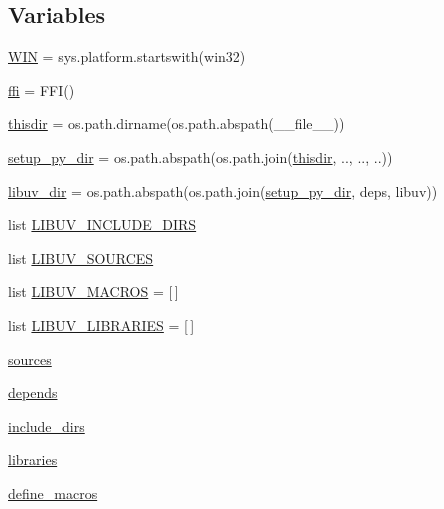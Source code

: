 \subsection*{Variables}
\begin{DoxyCompactItemize}
\item 
\hyperlink{namespacegevent_1_1libuv_1_1__corecffi__build_a2ec910473aa5ebc6912ef9ab9a5e9d19}{W\+IN} = sys.\+platform.\+startswith(\textquotesingle{}win32\textquotesingle{})
\item 
\hyperlink{namespacegevent_1_1libuv_1_1__corecffi__build_a4bb1b8330f479edbb77d00f554cabae4}{ffi} = F\+FI()
\item 
\hyperlink{namespacegevent_1_1libuv_1_1__corecffi__build_ac98ff08f1ed6cc8b007ec1911960c90f}{thisdir} = os.\+path.\+dirname(os.\+path.\+abspath(\+\_\+\+\_\+file\+\_\+\+\_\+))
\item 
\hyperlink{namespacegevent_1_1libuv_1_1__corecffi__build_a89415d476f2dadbcfd1af5bf86001bef}{setup\+\_\+py\+\_\+dir} = os.\+path.\+abspath(os.\+path.\+join(\hyperlink{namespacegevent_1_1libuv_1_1__corecffi__build_ac98ff08f1ed6cc8b007ec1911960c90f}{thisdir}, \textquotesingle{}..\textquotesingle{}, \textquotesingle{}..\textquotesingle{}, \textquotesingle{}..\textquotesingle{}))
\item 
\hyperlink{namespacegevent_1_1libuv_1_1__corecffi__build_a8a8816442c32f7739091f9d27a742707}{libuv\+\_\+dir} = os.\+path.\+abspath(os.\+path.\+join(\hyperlink{namespacegevent_1_1libuv_1_1__corecffi__build_a89415d476f2dadbcfd1af5bf86001bef}{setup\+\_\+py\+\_\+dir}, \textquotesingle{}deps\textquotesingle{}, \textquotesingle{}libuv\textquotesingle{}))
\item 
list \hyperlink{namespacegevent_1_1libuv_1_1__corecffi__build_a365fd82718cbe869e92a3b470777e428}{L\+I\+B\+U\+V\+\_\+\+I\+N\+C\+L\+U\+D\+E\+\_\+\+D\+I\+RS}
\item 
list \hyperlink{namespacegevent_1_1libuv_1_1__corecffi__build_a0419d4ae6f61877c656f35a2537109ce}{L\+I\+B\+U\+V\+\_\+\+S\+O\+U\+R\+C\+ES}
\item 
list \hyperlink{namespacegevent_1_1libuv_1_1__corecffi__build_a65dab17a04f92f77fe5dab25b7fc0a4b}{L\+I\+B\+U\+V\+\_\+\+M\+A\+C\+R\+OS} = \mbox{[}$\,$\mbox{]}
\item 
list \hyperlink{namespacegevent_1_1libuv_1_1__corecffi__build_a102afd2d44f57a582bf4b675f7633b6d}{L\+I\+B\+U\+V\+\_\+\+L\+I\+B\+R\+A\+R\+I\+ES} = \mbox{[}$\,$\mbox{]}
\item 
\hyperlink{namespacegevent_1_1libuv_1_1__corecffi__build_aa3a01e87d7c459be08041774472cb09c}{sources}
\item 
\hyperlink{namespacegevent_1_1libuv_1_1__corecffi__build_ab817377a29f35a07c1756c94dbb4ad31}{depends}
\item 
\hyperlink{namespacegevent_1_1libuv_1_1__corecffi__build_ae4afbe676b5468d2fcff9cba69d37e8e}{include\+\_\+dirs}
\item 
\hyperlink{namespacegevent_1_1libuv_1_1__corecffi__build_abb686ede3f6f8387d750a91bf343f46e}{libraries}
\item 
\hyperlink{namespacegevent_1_1libuv_1_1__corecffi__build_a38302fecb43e628bdd6c8b9c91738cb0}{define\+\_\+macros}
\end{DoxyCompactItemize}



